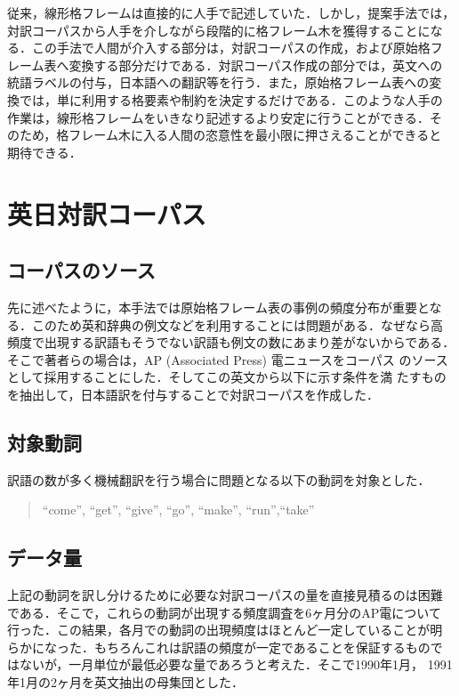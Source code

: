従来，線形格フレームは直接的に人手で記述していた．しかし，提案手法では，
対訳コーパスから人手を介しながら段階的に格フレーム木を獲得することにな
る．この手法で人間が介入する部分は，対訳コーパスの作成，および原始格フ
レーム表へ変換する部分だけである．対訳コーパス作成の部分では，英文への
統語ラベルの付与，日本語への翻訳等を行う．また，原始格フレーム表への変
換では，単に利用する格要素や制約を決定するだけである．このような人手の
作業は，線形格フレームをいきなり記述するより安定に行うことができる．そ
のため，格フレーム木に入る人間の恣意性を最小限に押さえることができると
期待できる．

\section{英日対訳コーパス}

\subsection{コーパスのソース}

先に述べたように，本手法では原始格フレーム表の事例の頻度分布が重要とな
る．このため英和辞典の例文などを利用することには問題がある．なぜなら高
頻度で出現する訳語もそうでない訳語も例文の数にあまり差がないからである．
そこで著者らの場合は，AP (Associated Press) 電ニュースをコーパス
のソースとして採用することにした．そしてこの英文から以下に示す条件を満
たすものを抽出して，日本語訳を付与することで対訳コーパスを作成した．

\subsection{対象動詞}
訳語の数が多く機械翻訳を行う場合に問題となる以下の動詞を対象とした．
\begin{quote}
  ``come'', ``get'', ``give'', ``go'', ``make'', ``run'',``take''
\end{quote}

\subsection{データ量}

上記の動詞を訳し分けるために必要な対訳コーパスの量を直接見積るのは困難
である．そこで，これらの動詞が出現する頻度調査を6ヶ月分のAP電について
行った．この結果，各月での動詞の出現頻度はほとんど一定していることが明
らかになった．もちろんこれは訳語の頻度が一定であることを保証するもので
はないが，一月単位が最低必要な量であろうと考えた．そこで1990年1月，
1991年1月の2ヶ月を英文抽出の母集団とした．

